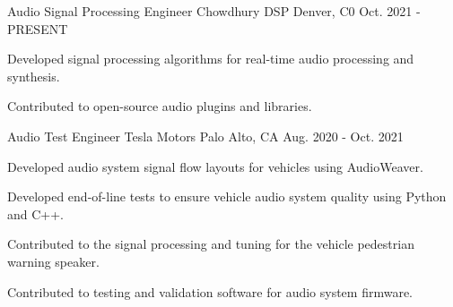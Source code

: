 

\begin{cventries}

  \cventry
    {Audio Signal Processing Engineer} %
    {Chowdhury DSP} %
    {Denver, C0} %
    {Oct. 2021 - PRESENT} %
    {
      \begin{cvitems} %
        \item {Developed signal processing algorithms for real-time audio processing and synthesis.}
        \item {Contributed to open-source audio plugins and libraries.}
      \end{cvitems}
    }

  \cventry
    {Audio Test Engineer} %
    {Tesla Motors} %
    {Palo Alto, CA} %
    {Aug. 2020 - Oct. 2021} %
    {
      \begin{cvitems} %
        \item {Developed audio system signal flow layouts for vehicles using AudioWeaver.}
        \item {Developed end-of-line tests to ensure vehicle audio system quality using Python and C++.}
        \item {Contributed to the signal processing and tuning for the vehicle pedestrian warning speaker.}
        \item {Contributed to testing and validation software for audio system firmware.}
      \end{cvitems}
    }


\end{cventries}
